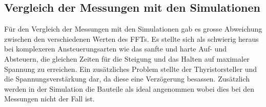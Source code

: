 \subsection{Vergleich der Messungen mit den Simulationen}
Für den Vergleich der Messungen mit den Simulationen gab es grosse Abweichung zwischen den verschiedenen Werten des FFTs. Es stellte sich als schwierig heraus bei komplexeren Ansteuerungsarten wie das sanfte und harte Auf- und Absteuern, die gleichen Zeiten für die Steigung und das Halten auf maximaler Spannung zu erreichen. Ein zusätzliches Problem stellte der Thyristorsteller und die Spannungsverstärkung dar, da diese eine Verzögerung besassen. Zusätzlich werden in der Simulation die Bauteile als ideal angenommen wobei dies bei den Messungen nicht der Fall ist.







